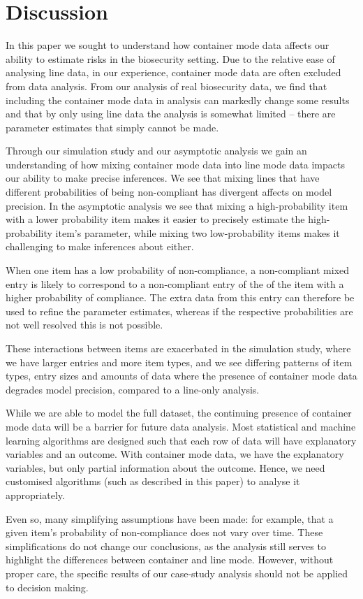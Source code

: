 \documentclass{article}
\newif\ifproofread
\newcommand{\rev}[1]{%
\ifproofread
\hl{#1}%
\else
#1%
\fi
}
\begin{document}
\section{Discussion}

In this paper we sought to understand how container mode data affects our ability to estimate risks in the biosecurity setting. Due to the relative ease of analysing line data, in our experience, container mode data are often excluded from data analysis. From our analysis of real biosecurity data, we find that including the container mode data in analysis can markedly change some results and that by only using line data the analysis is somewhat limited -- there are parameter estimates that simply cannot be made. 

Through our simulation study and our asymptotic analysis we gain an understanding of how mixing container mode data into line mode data impacts our ability to make precise inferences. We see that mixing lines that have different probabilities of being non-compliant has divergent affects on model precision. In the asymptotic analysis we see that mixing a high-probability item with a lower probability item makes it easier to precisely estimate the high-probability item's parameter, while mixing two low-probability items makes it challenging to make inferences about either. \rev{When one item has a low probability of non-compliance, a non-compliant mixed entry is likely to correspond to a non-compliant entry of the of the item with a higher probability of compliance.  The extra data from this entry can therefore be used to refine the parameter estimates, whereas if the respective probabilities are not well resolved this is not possible.} These interactions between items are exacerbated in the simulation study, where we have larger entries and more item types, and we see differing patterns of item types, entry sizes and amounts of data where the presence of container mode data degrades model precision, compared to a line-only analysis. 

While we are able to model the full dataset, the continuing presence of container mode data will be a barrier for future data analysis. Most statistical and machine learning algorithms are designed such that each row of data will have explanatory variables and an outcome. With container mode data, we have the explanatory variables, but only partial information about the outcome. Hence, we need customised algorithms (such as described in this paper) to analyse it appropriately. \rev{Even so, many simplifying assumptions have been made: for example, that a given item's probability of non-compliance does not vary over time. These simplifications do not change our conclusions, as the analysis still serves to highlight the differences between container and line mode. However, without proper care, the specific results of our case-study analysis should not be applied to decision making.} %
\end{document}

